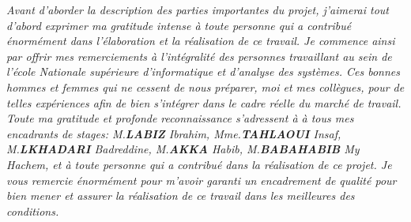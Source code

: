 \textit{
    Avant d'aborder la description des parties importantes du projet,
    j'aimerai tout d’abord exprimer ma gratitude
    intense à toute personne qui a contribué énormément dans l'élaboration
    et la réalisation de ce travail. Je commence
    ainsi par offrir mes remerciements à l'intégralité des personnes
    travaillant au sein de l’école Nationale supérieure d’informatique et d’analyse
    des systèmes. Ces bonnes hommes et femmes qui ne cessent de nous préparer, moi
    et
    mes collègues, pour de telles expériences afin de bien s’intégrer dans
    le cadre réelle du marché de travail.
    Toute ma gratitude et profonde reconnaissance s’adressent à à tous mes
    encadrants de stages: M.\textbf{LABIZ} Ibrahim,  Mme.\textbf{TAHLAOUI} Insaf, M.\textbf{LKHADARI} Badreddine,
    M.\textbf{AKKA} Habib, M.\textbf{BABAHABIB} My Hachem, et à toute personne qui a contribué dans la réalisation de ce projet. Je vous remercie énormément pour m'avoir
    garanti un encadrement de qualité pour bien mener
    et assurer la réalisation de ce travail dans les meilleures des
    conditions.
}
